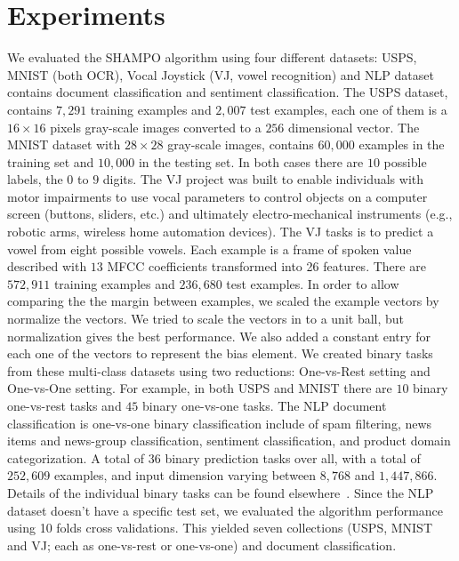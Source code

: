 \chapter{Experiments}

We evaluated the SHAMPO algorithm using four different datasets: USPS, MNIST (both OCR), Vocal Joystick 
(VJ, vowel recognition) and NLP dataset contains document classification and sentiment classification. 
The USPS dataset, contains $7,291$ training examples and $2,007$ test examples, each one of them is a 
$16\times16$ pixels gray-scale images converted to a $256$ dimensional vector. 
The MNIST dataset with $28\times28$ gray-scale images, contains $60,000$ 
examples in the training set and $10,000$ in the testing set. In both cases there are $10$ possible labels,
the $0$ to $9$ digits. The VJ project was built to enable individuals with motor impairments to use vocal
 parameters to control objects on a computer screen (buttons, sliders, etc.) and ultimately 
 electro-mechanical instruments (e.g., robotic arms, wireless home automation devices). The VJ tasks is to 
 predict a vowel from eight possible vowels. Each example is a frame of spoken value described with $13$ 
 MFCC coefficients transformed into 26 features. There are $572,911$ training examples and $236,680$ test 
 examples. In order to allow comparing the the margin between examples, we scaled the example vectors by 
 normalize the vectors. We tried to scale the vectors in to a unit ball, but normalization gives the best performance.
 We also added a constant entry for each one of the vectors to represent the 
 bias element. We created binary tasks from these multi-class datasets using two reductions: One-vs-Rest 
 setting and One-vs-One setting. For example, in both USPS and MNIST there are $10$ binary one-vs-rest 
 tasks and $45$ binary one-vs-one tasks.  The NLP document classification is one-vs-one  binary 
 classification include of spam filtering, news items and news-group classification, sentiment classification, 
 and product domain categorization. A total of $36$ binary prediction tasks over all, with a total of 
 $252,609$ examples, and input dimension varying between $8,768$ and $1,447,866$. 
 Details of the individual binary tasks can be found elsewhere~\cite{Crammer:2012:CLC:2343676.2343704}.
Since the NLP dataset doesn't have a specific test set, we evaluated the algorithm performance using 
10 folds cross validations. This yielded seven collections (USPS, MNIST and VJ\@; each as one-vs-rest or one-vs-one) and document 
classification.

